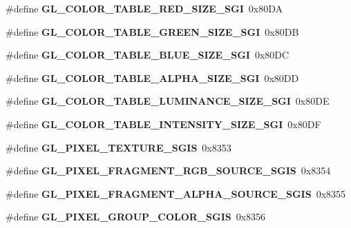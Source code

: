 \begin{DoxyCompactItemize}
\item 
\#define {\bfseries G\+L\+\_\+\+C\+O\+L\+O\+R\+\_\+\+T\+A\+B\+L\+E\+\_\+\+R\+E\+D\+\_\+\+S\+I\+Z\+E\+\_\+\+S\+G\+I}~0x80\+D\+A\label{_s_d_l__opengl_8h_a68f8e77dea1fe0d10d8b153f55d8396b}

\item 
\#define {\bfseries G\+L\+\_\+\+C\+O\+L\+O\+R\+\_\+\+T\+A\+B\+L\+E\+\_\+\+G\+R\+E\+E\+N\+\_\+\+S\+I\+Z\+E\+\_\+\+S\+G\+I}~0x80\+D\+B\label{_s_d_l__opengl_8h_a8557d1d60b7b3d893f9e0aa25c9396d5}

\item 
\#define {\bfseries G\+L\+\_\+\+C\+O\+L\+O\+R\+\_\+\+T\+A\+B\+L\+E\+\_\+\+B\+L\+U\+E\+\_\+\+S\+I\+Z\+E\+\_\+\+S\+G\+I}~0x80\+D\+C\label{_s_d_l__opengl_8h_a84274112ddefcf05bca7b24e4a541fa2}

\item 
\#define {\bfseries G\+L\+\_\+\+C\+O\+L\+O\+R\+\_\+\+T\+A\+B\+L\+E\+\_\+\+A\+L\+P\+H\+A\+\_\+\+S\+I\+Z\+E\+\_\+\+S\+G\+I}~0x80\+D\+D\label{_s_d_l__opengl_8h_a81aeeb0ee3492e0f53a6910711a71548}

\item 
\#define {\bfseries G\+L\+\_\+\+C\+O\+L\+O\+R\+\_\+\+T\+A\+B\+L\+E\+\_\+\+L\+U\+M\+I\+N\+A\+N\+C\+E\+\_\+\+S\+I\+Z\+E\+\_\+\+S\+G\+I}~0x80\+D\+E\label{_s_d_l__opengl_8h_a468f677e40ea12ca23d2597f6c8ead86}

\item 
\#define {\bfseries G\+L\+\_\+\+C\+O\+L\+O\+R\+\_\+\+T\+A\+B\+L\+E\+\_\+\+I\+N\+T\+E\+N\+S\+I\+T\+Y\+\_\+\+S\+I\+Z\+E\+\_\+\+S\+G\+I}~0x80\+D\+F\label{_s_d_l__opengl_8h_aafcdbd69fe615f0b50c898771513a8ba}

\item 
\#define {\bfseries G\+L\+\_\+\+P\+I\+X\+E\+L\+\_\+\+T\+E\+X\+T\+U\+R\+E\+\_\+\+S\+G\+I\+S}~0x8353\label{_s_d_l__opengl_8h_a9882267c7af823dbc5031ab477400cbe}

\item 
\#define {\bfseries G\+L\+\_\+\+P\+I\+X\+E\+L\+\_\+\+F\+R\+A\+G\+M\+E\+N\+T\+\_\+\+R\+G\+B\+\_\+\+S\+O\+U\+R\+C\+E\+\_\+\+S\+G\+I\+S}~0x8354\label{_s_d_l__opengl_8h_ab0ca3f2a8690cacc9b453214fb0f43a9}

\item 
\#define {\bfseries G\+L\+\_\+\+P\+I\+X\+E\+L\+\_\+\+F\+R\+A\+G\+M\+E\+N\+T\+\_\+\+A\+L\+P\+H\+A\+\_\+\+S\+O\+U\+R\+C\+E\+\_\+\+S\+G\+I\+S}~0x8355\label{_s_d_l__opengl_8h_a03f3b3cbb9aa70607f3296851f1dd343}

\item 
\#define {\bfseries G\+L\+\_\+\+P\+I\+X\+E\+L\+\_\+\+G\+R\+O\+U\+P\+\_\+\+C\+O\+L\+O\+R\+\_\+\+S\+G\+I\+S}~0x8356\label{_s_d_l__opengl_8h_af79d5b32c5354cc320c6fef90d0cc064}


\end{DoxyCompactItemize}

